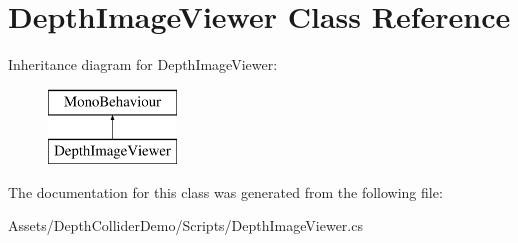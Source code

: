 \hypertarget{class_depth_image_viewer}{}\section{Depth\+Image\+Viewer Class Reference}
\label{class_depth_image_viewer}
Inheritance diagram for Depth\+Image\+Viewer\+:\begin{figure}[H]
\begin{center}
\leavevmode
\includegraphics[height=2.000000cm]{class_depth_image_viewer}
\end{center}
\end{figure}


The documentation for this class was generated from the following file\+:\begin{DoxyCompactItemize}
\item 
Assets/\+Depth\+Collider\+Demo/\+Scripts/Depth\+Image\+Viewer.\+cs\end{DoxyCompactItemize}
